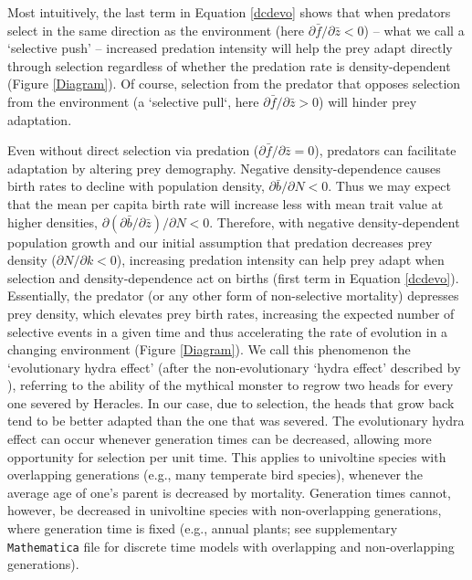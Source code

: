 \documentclass[11pt]{article}
\begin{document}
Most intuitively, the last term in Equation \eqref{dcdevo} shows that when predators select in the same direction as the environment (here $\partial \bar{f}/\partial \bar{z}<0$) -- what we call a `selective push' -- increased predation intensity will help the prey adapt directly through selection regardless of whether the predation rate is density-dependent (Figure \ref{Diagram}).
Of course, selection from the predator that opposes selection from the environment (a `selective pull`, here $\partial \bar{f}/\partial \bar{z}>0$) will hinder prey adaptation.

Even without direct selection via predation ($\partial \bar{f} / \partial \bar{z}=0$), predators can facilitate adaptation by altering prey demography.
Negative density-dependence causes birth rates to decline with population density, $\partial \bar{b}/\partial N < 0$. 
Thus we may expect that the mean per capita birth rate will increase less with mean trait value at higher densities, $\partial (\partial\bar{b}/\partial\bar{z}) / \partial N< 0$.
Therefore, with negative density-dependent population growth and our initial assumption that predation decreases prey density ($\partial N/\partial k<0$), increasing predation intensity can help prey adapt when selection and density-dependence act on births (first term in Equation \ref{dcdevo}). 
Essentially, the predator (or any other form of non-selective mortality) depresses prey density, which elevates prey birth rates, increasing the expected number of selective events in a given time and thus accelerating the rate of evolution in a changing environment (Figure \ref{Diagram}).
We call this phenomenon the `evolutionary hydra effect' (after the non-evolutionary `hydra effect' described by \citealt{Abrams2009b}), referring to the ability of the mythical monster to regrow two heads for every one severed by Heracles.
In our case, due to selection, the heads that grow back tend to be better adapted than the one that was severed.
The evolutionary hydra effect can occur whenever generation times can be decreased, allowing more opportunity for selection per unit time.
This applies to univoltine species with overlapping generations (e.g., many temperate bird species), whenever the average age of one's parent is decreased by mortality.
Generation times cannot, however, be decreased in univoltine species with non-overlapping generations, where generation time is fixed (e.g., annual plants; see supplementary \texttt{Mathematica} file for discrete time models with overlapping and non-overlapping generations). 
\end{document}
